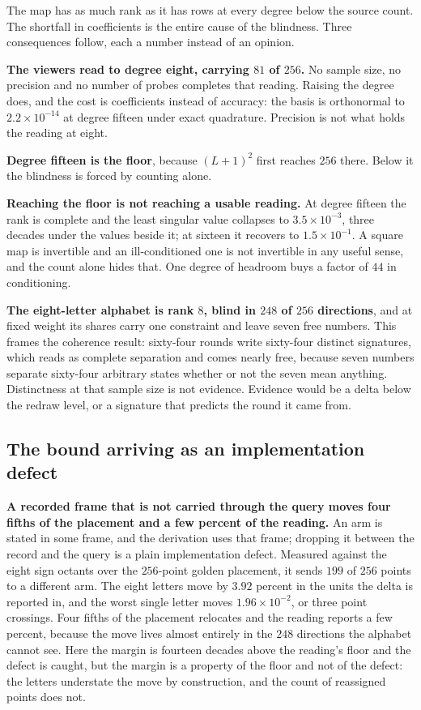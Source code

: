 The map has as much rank as it has rows at every degree below the source count. The shortfall in coefficients is the entire cause of the blindness. Three consequences follow, each a number instead of an opinion.

\textbf{The viewers read to degree eight, carrying \(81\) of \(256\).} No sample size, no precision and no number of probes completes that reading. Raising the degree does, and the cost is coefficients instead of accuracy: the basis is orthonormal to \(2.2 \times 10^{-14}\) at degree fifteen under exact quadrature. Precision is not what holds the reading at eight.

\textbf{Degree fifteen is the floor}, because \((L+1)^2\) first reaches \(256\) there. Below it the blindness is forced by counting alone.

\textbf{Reaching the floor is not reaching a usable reading.} At degree fifteen the rank is complete and the least singular value collapses to \(3.5 \times 10^{-3}\), three decades under the values beside it; at sixteen it recovers to \(1.5 \times 10^{-1}\). A square map is invertible and an ill-conditioned one is not invertible in any useful sense, and the count alone hides that. One degree of headroom buys a factor of \(44\) in conditioning.

\textbf{The eight-letter alphabet is rank \(8\), blind in \(248\) of \(256\) directions}, and at fixed weight its shares carry one constraint and leave seven free numbers. This frames the coherence result: sixty-four rounds write sixty-four distinct signatures, which reads as complete separation and comes nearly free, because seven numbers separate sixty-four arbitrary states whether or not the seven mean anything. Distinctness at that sample size is not evidence. Evidence would be a delta below the redraw level, or a signature that predicts the round it came from.

\subsection{The bound arriving as an implementation defect}

\textbf{A recorded frame that is not carried through the query moves four fifths of the placement and a few percent of the reading.} An arm is stated in some frame, and the derivation uses that frame; dropping it between the record and the query is a plain implementation defect. Measured against the eight sign octants over the \(256\)-point golden placement, it sends \(199\) of \(256\) points to a different arm. The eight letters move by \(3.92\) percent in the units the delta is reported in, and the worst single letter moves \(1.96 \times 10^{-2}\), or three point crossings. Four fifths of the placement relocates and the reading reports a few percent, because the move lives almost entirely in the \(248\) directions the alphabet cannot see. Here the margin is fourteen decades above the reading's floor and the defect is caught, but the margin is a property of the floor and not of the defect: the letters understate the move by construction, and the count of reassigned points does not.

